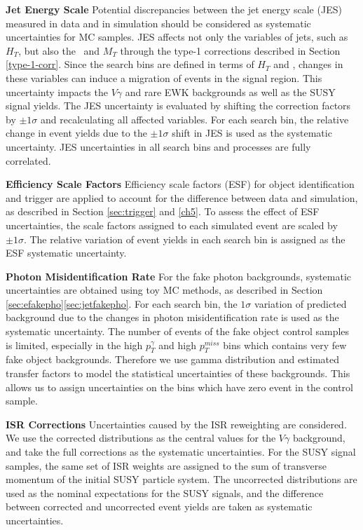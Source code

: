 \documentclass[thesis.tex]{subfiles}
\renewcommand\_{\textunderscore\allowbreak}
\begin{document}
\noindent \textbf{Jet Energy Scale} 
\quad Potential discrepancies between the jet energy scale (JES) measured in data and in simulation should be considered as systematic uncertainties for MC samples. 
JES affects not only the variables of jets, such as $H_T$, but also the \MET~and $M_T$ through the type-1 corrections described in Section \ref{type-1-corr}.
Since the search bins are defined in terms of $H_T$ and \MET, changes in these variables can induce a migration of events in the signal region. 
This uncertainty impacts the $V\gamma$ and rare EWK backgrounds as well as the SUSY signal yields. 
The JES uncertainty is evaluated by shifting the correction factors by $\pm 1 \sigma$ and recalculating all affected variables. 
For each search bin, the relative change in event yields due to the $\pm 1 \sigma$ shift in JES is used as the systematic uncertainty.
JES uncertainties in all search bins and processes are fully correlated. 

\noindent \textbf{Efficiency Scale Factors}
\quad Efficiency scale factors (ESF) for object identification and trigger are applied to account for the difference between data and simulation, as described in Section \ref{sec:trigger} and \ref{ch5}. 
To assess the effect of ESF uncertainties, the scale factors assigned to each simulated event are scaled by $\pm 1 \sigma$. 
The relative variation of event yields in each search bin is assigned as the ESF systematic uncertainty. 

\noindent \textbf{Photon Misidentification Rate} 
\quad For the fake photon backgrounds, systematic uncertainties are obtained using toy MC methods, as described in Section \ref{sec:efakepho}\ref{sec:jetfakepho}. 
For each search bin, the $1 \sigma$ variation of predicted background due to the changes in photon misidentification rate is used as the systematic uncertainty. 
The number of events of the fake object control samples is limited, especially in the high $p_T^{\gamma}$ and high $p_T^{miss}$ bins which contains very few fake object backgrounds. 
Therefore we use gamma distribution and estimated transfer factors to model the statistical uncertainties of these backgrounds. This allows us to assign uncertainties on the bins which have zero event in the control sample. 

\noindent \textbf{ISR Corrections} 
\quad Uncertainties caused by the ISR reweighting are considered. 
We use the corrected distributions as the central values for the $V\gamma$ background, and take the full corrections as the systematic uncertainties.
For the SUSY signal samples, the same set of ISR weights are assigned to the sum of transverse momentum of the initial SUSY particle system. 
The uncorrected distributions are used as the nominal expectations for the SUSY signals, and the difference between corrected and uncorrected event yields are taken as systematic uncertainties. 
\end{document}
